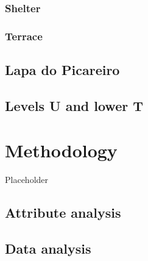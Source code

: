 \documentclass[12pt,twoside]{reedthesis}
\begin{document}
\hypertarget{shelter}{%
\subsection{Shelter}\label{shelter}}

\hypertarget{terrace}{%
\subsection{Terrace}\label{terrace}}

\hypertarget{lapa-do-picareiro-1}{%
\section{Lapa do Picareiro}\label{lapa-do-picareiro-1}}

\hypertarget{levels-u-and-lower-t}{%
\section{Levels U and lower T}\label{levels-u-and-lower-t}}

\hypertarget{methodology}{%
\chapter{Methodology}\label{methodology}}

Placeholder

\hypertarget{attribute-analysis}{%
\section{Attribute analysis}\label{attribute-analysis}}

\hypertarget{data-analysis}{%
\section{Data analysis}\label{data-analysis}}
\end{document}
